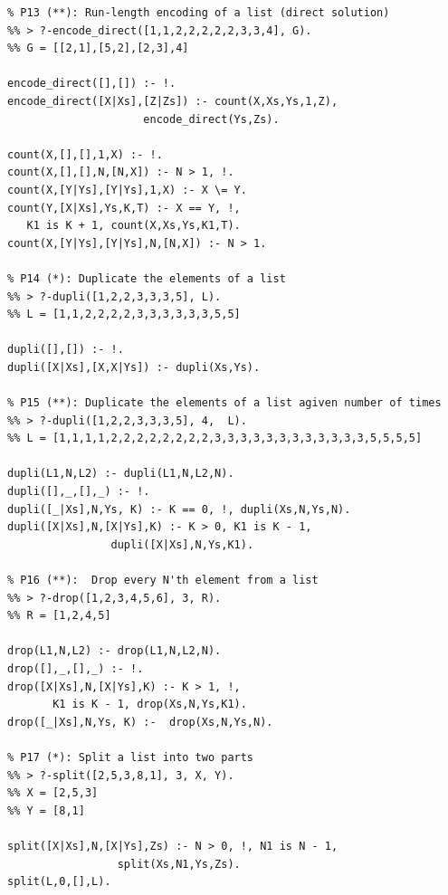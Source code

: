 \documentclass[a4paper,12pt]{book}
\begin{document}
\pagebreak
\begin{verbatim}
% P13 (**): Run-length encoding of a list (direct solution) 
%% > ?-encode_direct([1,1,2,2,2,2,2,3,3,4], G).
%% G = [[2,1],[5,2],[2,3],4]

encode_direct([],[]) :- !.
encode_direct([X|Xs],[Z|Zs]) :- count(X,Xs,Ys,1,Z),
                     encode_direct(Ys,Zs).

count(X,[],[],1,X) :- !.
count(X,[],[],N,[N,X]) :- N > 1, !.
count(X,[Y|Ys],[Y|Ys],1,X) :- X \= Y.
count(Y,[X|Xs],Ys,K,T) :- X == Y, !,
   K1 is K + 1, count(X,Xs,Ys,K1,T).
count(X,[Y|Ys],[Y|Ys],N,[N,X]) :- N > 1.

% P14 (*): Duplicate the elements of a list
%% > ?-dupli([1,2,2,3,3,3,5], L).
%% L = [1,1,2,2,2,2,3,3,3,3,3,3,5,5]

dupli([],[]) :- !.
dupli([X|Xs],[X,X|Ys]) :- dupli(Xs,Ys).

% P15 (**): Duplicate the elements of a list agiven number of times
%% > ?-dupli([1,2,2,3,3,3,5], 4,  L).
%% L = [1,1,1,1,2,2,2,2,2,2,2,2,3,3,3,3,3,3,3,3,3,3,3,3,5,5,5,5]

dupli(L1,N,L2) :- dupli(L1,N,L2,N).
dupli([],_,[],_) :- !.
dupli([_|Xs],N,Ys, K) :- K == 0, !, dupli(Xs,N,Ys,N).
dupli([X|Xs],N,[X|Ys],K) :- K > 0, K1 is K - 1,
                dupli([X|Xs],N,Ys,K1).

% P16 (**):  Drop every N'th element from a list
%% > ?-drop([1,2,3,4,5,6], 3, R).
%% R = [1,2,4,5]

drop(L1,N,L2) :- drop(L1,N,L2,N).
drop([],_,[],_) :- !.
drop([X|Xs],N,[X|Ys],K) :- K > 1, !,
       K1 is K - 1, drop(Xs,N,Ys,K1).
drop([_|Xs],N,Ys, K) :-  drop(Xs,N,Ys,N).

% P17 (*): Split a list into two parts
%% > ?-split([2,5,3,8,1], 3, X, Y).
%% X = [2,5,3]
%% Y = [8,1]

split([X|Xs],N,[X|Ys],Zs) :- N > 0, !, N1 is N - 1,
                 split(Xs,N1,Ys,Zs).
split(L,0,[],L).
\end{verbatim}
\end{document}
